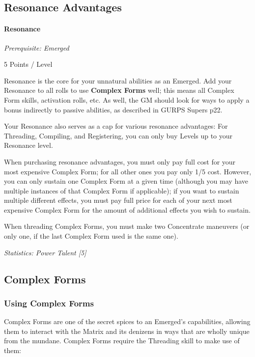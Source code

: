 \begin{multicols*}{3}
	\subsection{Resonance Advantages}
	
	\paragraph{Resonance}
	\textit{Prerequisite: Emerged}
	\begin{flushright}
		5 Points / Level
	\end{flushright}
	
	Resonance is the core for your unnatural abilities as an Emerged. Add your Resonance to all rolls to use \textbf{Complex Forms} well; this means all Complex Form skills, activation rolls, etc. As well, the GM should look for ways to apply a bonus indirectly to passive abilities, as described in GURPS Supers p22.
	
	Your Resonance also serves as a cap for various resonance advantages: For Threading, Compiling, and Registering, you can only buy Levels up to your Resonance level.
	
	When purchasing resonance advantages, you must only pay full cost for your most expensive Complex Form; for all other ones you pay only 1/5 cost. However, you can only sustain one Complex Form at a given time (although you may have multiple instances of that Complex Form if applicable); if you want to sustain multiple different effects, you must pay full price for each of your next most expensive Complex Form for the amount of additional effects you wish to sustain.
	
	When threading Complex Forms, you must make two Concentrate maneuvers (or only one, if the last Complex Form used is the same one).
	
	\textit{\textcolor{OliveGreen}{Statistics: Power Talent [5]}}
	
	\subsection{Complex Forms}
	
	\subsubsection{Using Complex Forms}
	
	Complex Forms are one of the secret spices to an Emerged's capabilities, allowing them to interact with the Matrix and its denizens in ways that are wholly unique from the mundane. Complex Forms require the Threading skill to make use of them:
	

\end{multicols*}

